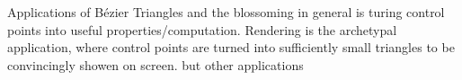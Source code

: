 
Applications of Bézier Triangles and the blossoming in general is turing control points into useful properties/computation.
Rendering is the archetypal application,
where control points are turned into sufficiently small triangles to be convincingly showen on screen.
but other applications 
